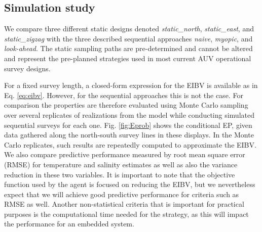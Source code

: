 \subsection{Simulation study}
\label{sec:simulations}

\label{sec:sampling_designs}


We compare three different static designs denoted
\textit{static\_north}, \textit{static\_east}, and
\textit{static\_zigzag} with the three described sequential approaches
\textit{naive}, \textit{myopic}, and \textit{look-ahead}. The static
sampling paths are pre-determined and cannot be altered and represent
the pre-planned strategies used in most current AUV operational survey
designs.

For a fixed survey length, a closed-form expression for the EIBV is
available as in Eq. \eqref{eq:eibv}. However, for the sequential
approaches this is not the case. For comparison the properties are
therefore evaluated using Monte Carlo sampling over several replicates
of realizations from the model while conducting simulated sequential
surveys for each one. Fig. \ref{fig:Eprob} shows the conditional EP,
given data gathered along the north-south survey lines in these
displays. In the Monte Carlo replicates, such results are repeatedly
computed to approximate the EIBV. We also compare predictive
performance measured by root mean square error (RMSE) for temperature
and salinity estimates as well as also the variance reduction in these
two variables. It is important to note that the objective function
used by the agent  is focused on reducing the
EIBV, but we nevertheless expect that we will achieve good predictive
performance for criteria such as RMSE as well. Another non-statistical
criteria that is important for practical purposes is the computational
time needed for the strategy, as this will impact the performance for
an embedded system.

